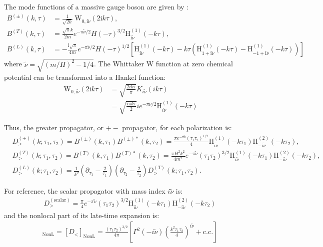 \documentclass[a4paper,12pt]{article}
\def\tn{\tilde\nu}
\begin{document}
The mode functions of a massive gauge boson are given by \cite{qin_helical_2023}:
\begin{align}
    B^{( \pm)}(k, \tau) & =\frac{1}{\sqrt{2 k}} \mathrm{~W}_{ 0, \mathrm{i} \tilde{\nu}}(2 \mathrm{i} k \tau), \\
    B^{(T)}(k, \tau) & =\frac{\sqrt{\pi} k}{2 m} e^{-\pi \tilde{\nu} / 2} H(-\tau)^{3 / 2} \mathrm{H}_{\mathrm{i} \tilde{\nu}}^{(1)}(-k \tau), \\
    B^{(L)}(k, \tau) & =-\frac{\mathrm{i} \sqrt{\pi}}{4 m} e^{-\pi \widetilde{\nu} / 2} H(-\tau)^{1 / 2}\left[\mathrm{H}_{\mathrm{i} \tilde{\nu}}^{(1)}(-k \tau)-k \tau\left(\mathrm{H}_{1+\mathrm{i} \tilde{\nu}}^{(1)}(-k \tau)-\mathrm{H}_{-1+\mathrm{i} \tilde{\nu}}^{(1)}(-k \tau)\right)\right]
\end{align}
where $\tilde\nu=\sqrt{(m/H)^2-1/4}$. The Whittaker W function at zero chemical potential can be transformed into a Hankel function:
\begin{align}
    \mathrm{~W}_{ 0, \mathrm{i} \tilde{\nu}}(2 \mathrm{i} k \tau) &= \sqrt{\frac{2ik\tau}{\pi}} K_{i \tilde\nu}(ik\tau) \nonumber \\
    &= \sqrt{\frac{ i\pi k\tau}{2}} ie^{-\pi \tilde\nu /2} \mathrm{H}^{(1)}_{i\tilde\nu}(-k\tau)
\end{align}

Thus, the greater propagator, or $+-$ propagator, for each polarization is:
\begin{align}
    &D_{>}^{( \pm)}\left(k ; \tau_{1}, \tau_{2}\right)=B^{( \pm)}\left(k, \tau_{1}\right) B^{( \pm) *}\left(k, \tau_{2}\right)=\frac{\pi e^{-\pi\tilde\nu} (\tau_1 \tau_2)^{1/2}}{4} \mathrm{H}_{\mathrm{i} \widetilde{\nu}}^{(1)}\left(-k \tau_{1}\right) \mathrm{H}_{-\mathrm{i} \widetilde{\nu}}^{(2)}\left(-k \tau_{2}\right), \\
    &D_{>}^{(T)}\left(k ; \tau_{1}, \tau_{2}\right)=B^{(T)}\left(k, \tau_{1}\right) B^{(T) *}\left(k, \tau_{2}\right)=\frac{\pi H^{2} k^{2}}{4 m^{2}} e^{-\pi \widetilde{\nu}}\left(\tau_{1} \tau_{2}\right)^{3 / 2} \mathrm{H}_{\mathrm{i} \widetilde{\nu}}^{(1)}\left(-k \tau_{1}\right) \mathrm{H}_{-\mathrm{i} \widetilde{\nu}}^{(2)}\left(-k \tau_{2}\right), \\
    &D_{>}^{(L)}\left(k ; \tau_{1}, \tau_{2}\right)=\frac{1}{k^{2}}\left(\partial_{\tau_{1}}-\frac{2}{\tau_{1}}\right)\left(\partial_{\tau_{2}}-\frac{2}{\tau_{2}}\right) D_{>}^{(T)}\left(k ; \tau_{1}, \tau_{2}\right).
\end{align}

For reference, the scalar propagator with mass index $i\tilde\nu$ is:
\begin{align}
    D^{(\text{scalar})}_> = \frac{\pi }{4 } e^{-\pi \widetilde{\nu}}\left(\tau_{1} \tau_{2}\right)^{3 / 2} \mathrm{H}_{\mathrm{i} \widetilde{\nu}}^{(1)}\left(-k \tau_{1}\right) \mathrm{H}_{-\mathrm{i} \widetilde{\nu}}^{(2)}\left(-k \tau_{2}\right)
\end{align}
and the nonlocal part of its late-time expansion is:
\begin{align}
    [D_>]_{\text{NonL}} = [D_<]_{\text{NonL}} = \frac{(\tau_1 \tau_2)^{3/2}}{4\pi} \left[ \Gamma^2(-i\tn) \left( \frac{k^2\tau_1\tau_2}{4} \right)^{i\tn} +\text{c.c.} \right]
\end{align}
\end{document}

